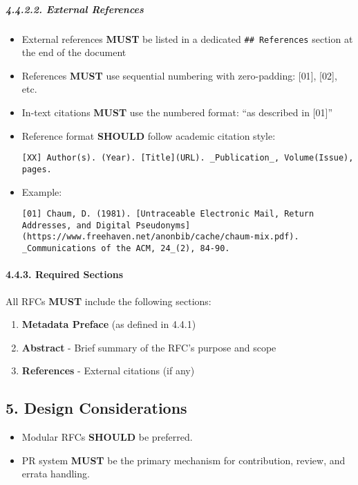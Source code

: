 \subparagraph{4.4.2.2. External References}\label{external-references}

\begin{itemize}
\item
  External references \textbf{MUST} be listed in a dedicated
  \texttt{\#\#\ References} section at the end of the document
\item
  References \textbf{MUST} use sequential numbering with zero-padding:
  {[}01{]}, {[}02{]}, etc.
\item
  In-text citations \textbf{MUST} use the numbered format: ``as
  described in {[}01{]}''
\item
  Reference format \textbf{SHOULD} follow academic citation style:

\begin{verbatim}
[XX] Author(s). (Year). [Title](URL). _Publication_, Volume(Issue), pages.
\end{verbatim}
\item
  Example:

\begin{verbatim}
[01] Chaum, D. (1981). [Untraceable Electronic Mail, Return Addresses, and Digital Pseudonyms](https://www.freehaven.net/anonbib/cache/chaum-mix.pdf). _Communications of the ACM, 24_(2), 84-90.
\end{verbatim}
\end{itemize}

\paragraph{4.4.3. Required Sections}\label{required-sections}

All RFCs \textbf{MUST} include the following sections:

\begin{enumerate}
\def\labelenumi{\arabic{enumi}.}
\tightlist
\item
  \textbf{Metadata Preface} (as defined in 4.4.1)
\item
  \textbf{Abstract} - Brief summary of the RFC's purpose and scope
\item
  \textbf{References} - External citations (if any)
\end{enumerate}

\subsection{5. Design Considerations}\label{design-considerations}

\begin{itemize}
\tightlist
\item
  Modular RFCs \textbf{SHOULD} be preferred.
\item
  PR system \textbf{MUST} be the primary mechanism for contribution,
  review, and errata handling.
\end{itemize}

